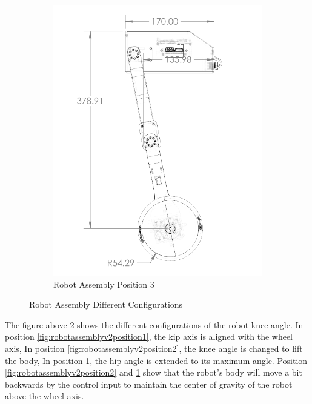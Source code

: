 \begin{figure}[h!]
\begin{subfigure}[b]{0.3\textwidth}
		\includegraphics[width=.9\linewidth]{Robot_Assembly_V2_position_3}
		\caption{Robot Assembly Position 3}
		\label{fig:robotassemblyv2position3}
	\end{subfigure}
	\caption[Robot Assembly Different Configurations]{Robot Assembly Different Configurations}
	\label{fig:robotassemblyv2differentconfigurations}
\end{figure}

The figure above \ref{fig:robotassemblyv2differentconfigurations} shows the different configurations of the robot knee angle.
In position \ref{fig:robotassemblyv2position1}, the kip axis is aligned with the wheel axis, In position \ref{fig:robotassemblyv2position2}, the knee angle is changed to lift the body, In position \ref{fig:robotassemblyv2position3}, the hip angle is extended to its maximum angle.
Position \ref{fig:robotassemblyv2position2} and \ref{fig:robotassemblyv2position3} show that the robot's body will move a bit backwards by the control input to maintain the center of gravity of the robot above the wheel axis.


